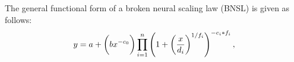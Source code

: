 \documentclass{article} %
\begin{document}


\vspace{-2.2mm}

The general functional form of a broken neural scaling law (BNSL) is given as follows:
\begin{equation}
\vspace{-0.05in}
y =  a + \bigg(bx^{-c_0}\bigg) \prod_{i=1}^n \left(1 + \left(\frac{x}{d_i}\right)^{1/f_i}\right)^{-c_i * f_i},
\label{eq:BNSL}
\end{equation}

\end{document}
